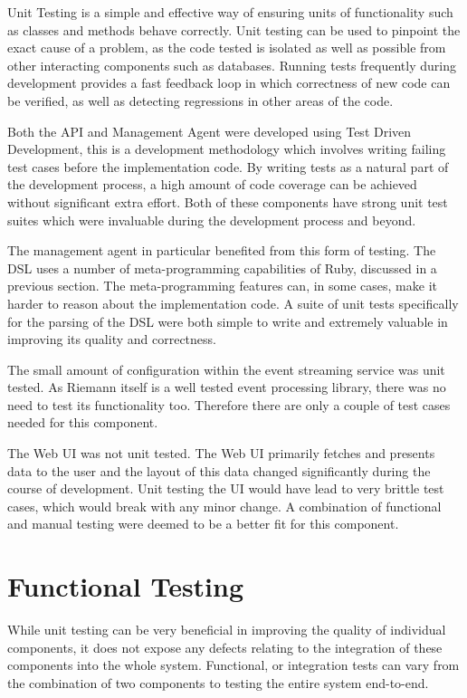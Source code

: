 \documentclass{cshonours}
\begin{document}
Unit Testing is a simple and effective way of ensuring units of functionality such as classes and methods behave correctly. Unit testing can be used to pinpoint the exact cause of a problem, as the code tested is isolated as well as possible from other interacting components such as databases. Running tests frequently during development provides a fast feedback loop in which correctness of new code can be verified, as well as detecting regressions in other areas of the code.

Both the API and Management Agent were developed using Test Driven Development, this is a development methodology which involves writing failing test cases before the implementation code. By writing tests as a natural part of the development process, a high amount of code coverage can be achieved without significant extra effort. Both of these components have strong unit test suites which were invaluable during the development process and beyond.

The management agent in particular benefited from this form of testing. The DSL uses a number of meta-programming capabilities of Ruby, discussed in a previous section. The meta-programming features can, in some cases, make it harder to reason about the implementation code. A suite of unit tests specifically for the parsing of the DSL were both simple to write and extremely valuable in improving its quality and correctness.

The small amount of configuration within the event streaming service was unit tested. As Riemann itself is a well tested event processing library, there was no need to test its functionality too. Therefore there are only a couple of test cases needed for this component.

The Web UI was not unit tested. The Web UI primarily fetches and presents data to the user and the layout of this data changed significantly during the course of development. Unit testing the UI would have lead to very brittle test cases, which would break with any minor change. A combination of functional and manual testing were deemed to be a better fit for this component.

\section{Functional Testing}

While unit testing can be very beneficial in improving the quality of individual components, it does not expose any defects relating to the integration of these components into the whole system. Functional, or integration tests can vary from the combination of two components to testing the entire system end-to-end.
\end{document}
